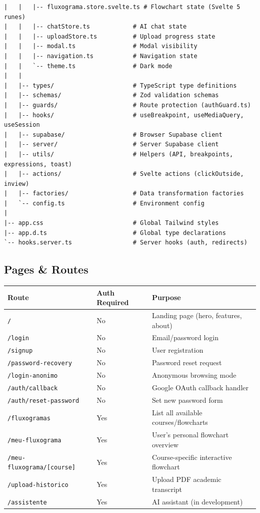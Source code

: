 \documentclass[11pt,a4paper]{article}
\newcommand{\code}[1]{\texttt{#1}}
\begin{document}
\begin{lstlisting}
|   |   |-- fluxograma.store.svelte.ts # Flowchart state (Svelte 5 runes)
|   |   |-- chatStore.ts            # AI chat state
|   |   |-- uploadStore.ts          # Upload progress state
|   |   |-- modal.ts                # Modal visibility
|   |   |-- navigation.ts           # Navigation state
|   |   `-- theme.ts                # Dark mode
|   |
|   |-- types/                      # TypeScript type definitions
|   |-- schemas/                    # Zod validation schemas
|   |-- guards/                     # Route protection (authGuard.ts)
|   |-- hooks/                      # useBreakpoint, useMediaQuery, useSession
|   |-- supabase/                   # Browser Supabase client
|   |-- server/                     # Server Supabase client
|   |-- utils/                      # Helpers (API, breakpoints, expressions, toast)
|   |-- actions/                    # Svelte actions (clickOutside, inview)
|   |-- factories/                  # Data transformation factories
|   `-- config.ts                   # Environment config
|
|-- app.css                         # Global Tailwind styles
|-- app.d.ts                        # Global type declarations
`-- hooks.server.ts                 # Server hooks (auth, redirects)
\end{lstlisting}

\subsection{Pages \& Routes}

\begin{center}
\begin{longtable}{@{}L{4.5cm}L{2.2cm}L{6cm}@{}}
\toprule
\textbf{Route} & \textbf{Auth Required} & \textbf{Purpose} \\
\midrule
\endhead
\code{/}                         & No  & Landing page (hero, features, about) \\
\code{/login}                    & No  & Email/password login \\
\code{/signup}                   & No  & User registration \\
\code{/password-recovery}        & No  & Password reset request \\
\code{/login-anonimo}            & No  & Anonymous browsing mode \\
\code{/auth/callback}            & No  & Google OAuth callback handler \\
\code{/auth/reset-password}      & No  & Set new password form \\
\code{/fluxogramas}              & Yes & List all available courses/flowcharts \\
\code{/meu-fluxograma}           & Yes & User's personal flowchart overview \\
\code{/meu-fluxograma/[course]}  & Yes & Course-specific interactive flowchart \\
\code{/upload-historico}         & Yes & Upload PDF academic transcript \\
\code{/assistente}               & Yes & AI assistant (in development) \\
\bottomrule
\end{longtable}
\end{center}
\end{document}
